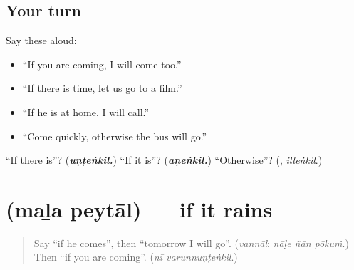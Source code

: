 \subsection*{Your turn}
Say these aloud:

\begin{itemize}
\raggedright
  \item \textquotedblleft{}If you are coming, I will come too.\textquotedblright{}
  \item \textquotedblleft{}If there is time, let us go to a film.\textquotedblright{}
  \item \textquotedblleft{}If he is at home, I will call.\textquotedblright{}
  \item \textquotedblleft{}Come quickly, otherwise the bus will go.\textquotedblright{}
\end{itemize}

\begin{tcolorbox}[breakable,colback=teal!4,colframe=teal!35!black,title={Before you move on}]
\textquotedblleft{}If there is\textquotedblright{}? (\emph{\textbf{uṇṭeṅkil.}}) \textquotedblleft{}If it is\textquotedblright{}? (\emph{\textbf{āṇeṅkil.}}) \textquotedblleft{}Otherwise\textquotedblright{}? (\textbf{}, \emph{illeṅkil}.)
\end{tcolorbox}
\section[\texorpdfstring{\ml{മഴ} \ml{പെയ്താൽ} (maḻa peytāl)}{മഴ പെയ്താൽ (maḻa peytāl)}]{  (maḻa peytāl) — if it rains}

\label{lesson:ML-C347-maza-peytal}



\begin{quote}
Say \textquotedblleft{}if he comes\textquotedblright{}, then \textquotedblleft{}tomorrow I will go\textquotedblright{}. (\emph{vannāl}; \emph{nāḷe ñān pōkuṁ}.) Then \textquotedblleft{}if you are coming\textquotedblright{}. (\emph{nī varunnuṇṭeṅkil}.)
\end{quote}

